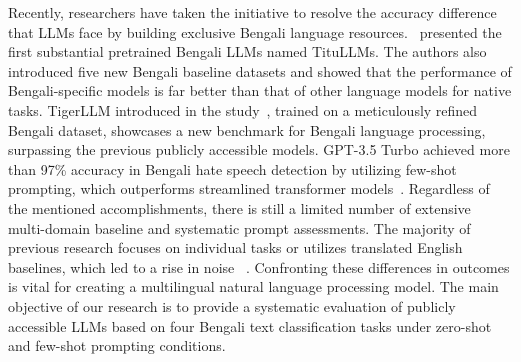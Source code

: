 \documentclass[10pt,letterpaper]{article}
\begin{document}
Recently, researchers have taken the initiative to resolve the accuracy difference that LLMs face by building exclusive Bengali language resources.~\cite{b21} presented the first substantial pretrained Bengali LLMs named TituLLMs. The authors also introduced five new Bengali baseline datasets and showed that the performance of Bengali-specific models is far better than that of other language models for native tasks. TigerLLM introduced in the study~\cite{b10}, trained on a meticulously refined Bengali dataset, showcases a new benchmark for Bengali language processing, surpassing the previous publicly accessible models. GPT-3.5 Turbo achieved more than 97\% accuracy in Bengali hate speech detection by utilizing few-shot prompting, which outperforms streamlined transformer models~\cite{b22}. Regardless of the mentioned accomplishments, there is still a limited number of extensive multi-domain baseline and systematic prompt assessments. The majority of previous research focuses on individual tasks or utilizes translated English baselines, which led to a rise in noise ~\cite{b6,b28}. Confronting these differences in outcomes is vital for creating a multilingual natural language processing model. The main objective of our research is to provide a systematic evaluation of publicly accessible LLMs based on four Bengali text classification tasks under zero-shot and few-shot prompting conditions.
\end{document}
